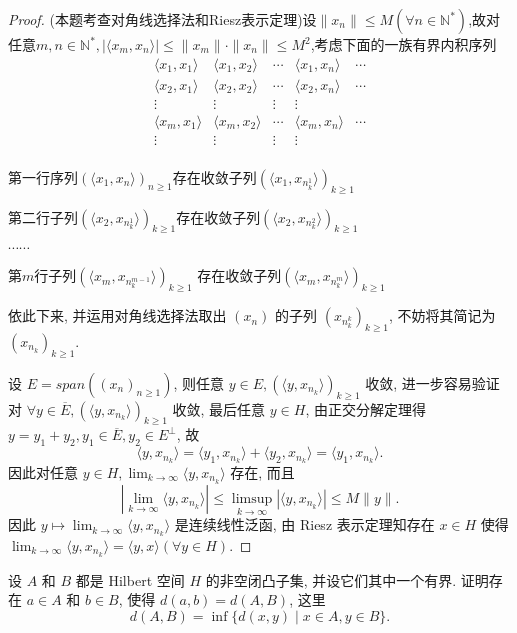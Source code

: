 \begin{proof}
(本题考查对角线选择法和Riesz表示定理)设$\|x_n\|\leq M(\forall n\in\mathbb{N^{*}})$,故对任意$m,n\in \mathbb{N^{*}},|\langle x_m,x_n\rangle|\leq\|x_m\|\cdot\|x_n\|\leq M^2$,考虑下面的一族有界内积序列
\[\begin{array}{ccccc}
\langle x_1,x_1\rangle&\langle x_1,x_2\rangle&\cdots&\langle x_1,x_n\rangle&\cdots\\
\langle x_2,x_1\rangle&\langle x_2,x_2\rangle&\cdots&\langle x_2,x_n\rangle&\cdots\\
\vdots&\vdots&\vdots&\vdots\\
\langle x_m,x_1\rangle&\langle x_m,x_2\rangle&\cdots&\langle x_m,x_n\rangle&\cdots\\
\vdots&\vdots&\vdots&\vdots\\
\end{array}\]

第一行序列$(\langle x_1,x_n\rangle)_{n\geq 1}$存在收敛子列$(\langle x_1,x_{n_k^1}\rangle)_{k\geq 1}$

第二行子列$(\langle x_2,x_{n_k^1}\rangle)_{k\geq 1}$存在收敛子列$(\langle x_2,x_{n_k^2}\rangle)_{k\geq 1}$

$\cdots\cdots$

第$m$行子列$(\langle x_m,x_{n_k^{m-1}}\rangle)_{k\geq 1}$
存在收敛子列$(\langle x_m,x_{n_k^m}\rangle)_{k\geq 1}$
 
依此下来, 并运用对角线选择法取出 $(x_n)$ 的子列 $(x_{n_k^k})_{k\geq 1}$,
不妨将其简记为 $(x_{n_k})_{k\geq 1}$.

设 $E=span((x_n)_{n\geq 1})$, 
则任意 $y\in E,(\langle y,x_{n_k}\rangle)_{k\geq 1}$ 收敛,
进一步容易验证对 $\forall y\in\overline{E},(\langle y,x_{n_k}\rangle)_{k\geq 1}$ 收敛,
最后任意 $y\in H$, 由正交分解定理得 $y=y_1+y_2,y_1\in\overline{E},y_2\in E^{\perp}$, 故
\[\langle y,x_{n_k}\rangle=\langle y_1,x_{n_k}\rangle+\langle y_2,x_{n_k}\rangle=\langle y_1,x_{n_k}\rangle.\]
因此对任意 $y\in H,\lim_{k\to\infty}\langle y,x_{n_k}\rangle$ 存在, 而且
\[\left|\lim_{k\to\infty}\langle y,x_{n_k}\rangle\right|\leq\limsup_{k\to\infty}|\langle y,x_{n_k}\rangle|\leq M\|y\|.\]
因此 $y\mapsto\lim_{k\to\infty}\langle y,x_{n_k}\rangle$ 是连续线性泛函, 
由 Riesz 表示定理知存在 $x\in H$ 使得 $\lim_{k\to\infty}\langle y,x_{n_k}\rangle=\langle y,x\rangle(\forall y\in H)$.
\end{proof}




\begin{exercise}
    设 $A$ 和 $B$ 都是 Hilbert 空间 $H$ 的非空闭凸子集,
    并设它们其中一个有界. 证明存在 $a\in A$ 和 $b\in B$,
    使得 $d(a,b)=d(A,B)$, 这里
    \[d(A,B)=\inf\{d(x,y)\mid x\in A, y\in B\}.\]
\end{exercise}

